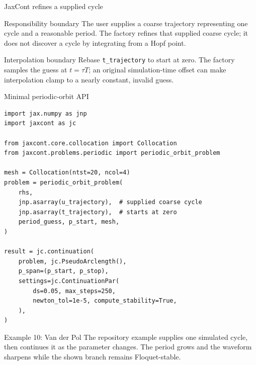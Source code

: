 \begin{frame}{JaxCont refines a supplied cycle}
\centering
{}
\vspace{6mm}
\begin{alertblock}{Responsibility boundary}
The user supplies a coarse trajectory representing one cycle and a reasonable
period. The factory refines that supplied coarse cycle; it does not discover a
cycle by integrating from a Hopf point.
\end{alertblock}
\begin{block}{Interpolation boundary}
Rebase \texttt{t\_trajectory} to start at zero. The factory samples the guess
at $t=\tau T$; an original simulation-time offset can make interpolation
clamp to a nearly constant, invalid guess.
\end{block}
\end{frame}

\begin{frame}[fragile]{Minimal periodic-orbit API}
\begin{lstlisting}[basicstyle=\ttfamily\tiny]
import jax.numpy as jnp
import jaxcont as jc

from jaxcont.core.collocation import Collocation
from jaxcont.problems.periodic import periodic_orbit_problem

mesh = Collocation(ntst=20, ncol=4)
problem = periodic_orbit_problem(
    rhs,
    jnp.asarray(u_trajectory),  # supplied coarse cycle
    jnp.asarray(t_trajectory),  # starts at zero
    period_guess, p_start, mesh,
)

result = jc.continuation(
    problem, jc.PseudoArclength(),
    p_span=(p_start, p_stop),
    settings=jc.ContinuationPar(
        ds=0.05, max_steps=250,
        newton_tol=1e-5, compute_stability=True,
    ),
)
\end{lstlisting}
\begin{block}{Example 10: Van der Pol}
The repository example supplies one simulated cycle, then continues it as the
parameter changes. The period grows and the waveform sharpens while the shown
branch remains Floquet-stable.
\end{block}
\end{frame}

